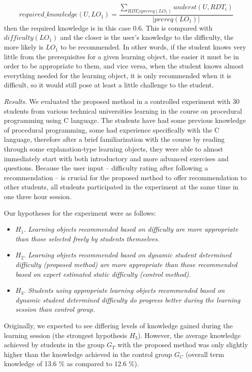 \documentclass{llncs}
\begin{document}
$$required\_knowledge(U, LO_1) = \frac{\sum_{RDT_i\epsilon prereq(LO_1)} underst(U, RDT_i)}{|prereq(LO_1)|}$$
then the required knowledge is in this case 0.6. This is compared with $difficulty (LO_1)$ and the closer is the user's knowledge to the difficulty, the more likely is $LO_1$ to be recommended. In other words, if the student knows very little from the prerequisites for a given learning object, the easier it must be in order to be appropriate to them, and vice versa, when the student knows almost everything needed for the learning object, it is only recommended when it is difficult, so it would still pose at least a little challenge to the student.

\emph{Results.} We evaluated the proposed method in a controlled experiment with 30 students from various technical universities learning in the course on procedural programming using C language. The students have had some previous knowledge of procedural programming, some had experience specifically with the C language, therefore after a brief familiarization with the course by reading through some explanation-type learning objects, they were able to almost immediately start with both introductory and more advanced exercises and questions. Because the user input – difficulty rating after following a recommendation – is crucial for the proposed method to offer recommendation to other students, all students participated in the experiment at the same time in one three hour session.

Our hypotheses for the experiment were as follows:

\begin{itemize}
\item $H_1$. \emph{Learning objects recommended based on difficulty are more appropriate than those selected freely by students themselves.}
\item $H_2$. \emph{Learning objects recommended based on dynamic student determined difficulty (proposed method) are more appropriate than those recommended based on expert estimated static difficulty (control method).}
\item $H_3$. \emph{Students using appropriate learning objects recommended based on dynamic student determined difficulty do progress better during the learning session than control group.}
\end{itemize}

Originally, we expected to see differing levels of knowledge gained during the learning session (the strongest hypothesis $H_3$). However, the average knowledge achieved by students in the group $G_T$ with the proposed method was only slightly higher than the knowledge achieved in the control group $G_C$ (overall term knowledge of 13.6 \% as compared to 12.6 \%).
\end{document}
